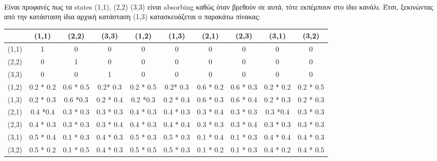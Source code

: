\noindent\\
Είναι προφανές πως τα states (1,1), (2,2) (3,3) είναι absorbing καθώς όταν βρεθούν σε αυτά, τότε εκπέμπουν στο ίδιο κανάλι. Έτσι, ξεκινώντας από την κατάσταση ίδια αρχική κατάσταση (1,3) κατασκευάζεται ο παρακάτω πίνακας:
\begin{table}[h]
    \begin{tabular}{|c|c|c|c|c|c|c|c|c|c|}
    \hline
          & (1,1)     & (2,2)     & (3,3)     & (1,2)     & (1,3)     & (2,1)     & (2,3)     & (3,1)     & (3,2)     \\ \hline
    (1,1) & 1         & 0         & 0         & 0         & 0         & 0         & 0         & 0         & 0         \\ \hline
    (2,2) & 0         & 1         & 0         & 0         & 0         & 0         & 0         & 0         & 0         \\ \hline
    (3,3) & 0         & 0         & 1         & 0         & 0         & 0         & 0         & 0         & 0         \\ \hline
    (1,2) & 0.2 * 0.2 & 0.6 * 0.5 & 0.2* 0.3  & 0.2 * 0.5 & 0.2* 0.3  & 0.6 * 0.2 & 0.6 * 0.3 & 0.2 * 0.2 & 0.2 * 0.5 \\ \hline
    (1,3) & 0.2 * 0.3 & 0.6 *0.3  & 0.2 * 0.4 & 0.2 *0.3  & 0.2 * 0.4 & 0.6 * 0.3 & 0.6 * 0.4 & 0.2 * 0.3 & 0.2 * 0.3 \\ \hline
    (2,1) & 0.4 *0.4  & 0.3 * 0.3 & 0.3 * 0.3 & 0.4 * 0.3 & 0.4 * 0.3 & 0.3 * 0.4 & 0.3 * 0.3 & 0.3 *0.4  & 0.3 * 0.3 \\ \hline
    (2,3) & 0.4 * 0.3 & 0.3 * 0.3 & 0.3 * 0.4 & 0.4 * 0.3 & 0.4 * 0.4 & 0.3 * 0.3 & 0.3 * 0.4 & 0.3 * 0.3 & 0.3 * 0.3 \\ \hline
    (3,1) & 0.5 * 0.4 & 0.1 * 0.3 & 0.4 * 0.3 & 0.5 * 0.3 & 0.5 * 0.3 & 0.1 * 0.4 & 0.1 * 0.3 & 0.4 * 0.4 & 0.4 * 0.3 \\ \hline
    (3,2) & 0.5 * 0.2 & 0.1 * 0.5 & 0.4 * 0.3 & 0.5 * 0.5 & 0.5 * 0.3 & 0.1 * 0.2 & 0.1 * 0.3 & 0.4 * 0.2 & 0.4 * 0.5 \\ \hline
    \end{tabular}
\end{table}

